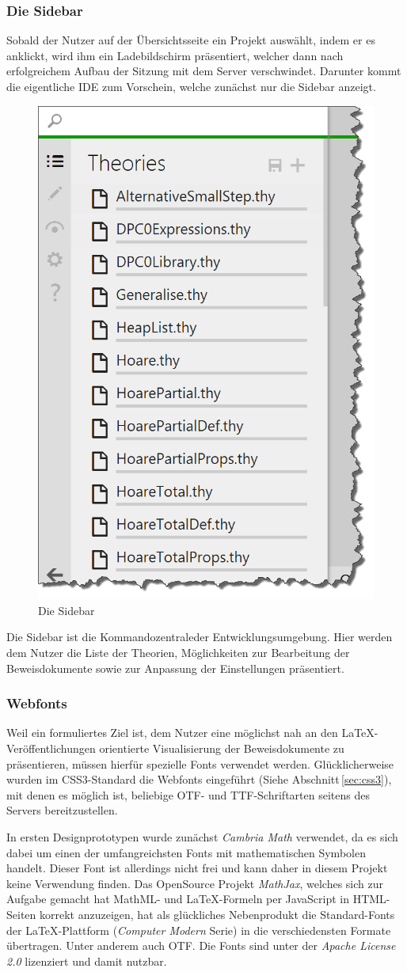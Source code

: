 \subsubsection{Die Sidebar}

Sobald der Nutzer auf der Übersichtsseite ein Projekt auswählt, indem er es anklickt, wird ihm ein
Ladebildschirm präsentiert, welcher dann nach erfolgreichem Aufbau der Sitzung mit dem Server
verschwindet. Darunter kommt die eigentliche IDE zum Vorschein, welche zunächst nur die Sidebar
anzeigt.

\begin{figure}[!ht]
\centering
\includegraphics[width=0.4\linewidth]{images/screen-sidebar}
  \caption{Die Sidebar}
  \label{fig:screen-sidebar}
\end{figure}

Die Sidebar ist die \glqq Kommandozentrale\grqq der Entwicklungsumgebung. Hier werden dem Nutzer die
Liste der Theorien, Möglichkeiten zur Bearbeitung der Beweisdokumente sowie zur Anpassung der
Einstellungen präsentiert.

\subsubsection{Webfonts}

Weil ein formuliertes Ziel ist, dem Nutzer eine möglichst nah an den \LaTeX-Veröffentlichungen
orientierte Visualisierung der Beweisdokumente zu präsentieren, müssen hierfür spezielle Fonts
verwendet werden. Glücklicherweise wurden im CSS3-Standard die Webfonts eingeführt (Siehe
Abschnitt\,\ref{sec:css3}), mit denen es möglich ist, beliebige OTF- und TTF-Schriftarten seitens
des Servers bereitzustellen.

In ersten Designprototypen wurde zunächst \textit{Cambria Math} verwendet, da es sich dabei um einen
der umfangreichsten Fonts mit mathematischen Symbolen handelt. Dieser Font ist allerdings nicht frei
und kann daher in diesem Projekt keine Verwendung finden. Das OpenSource Projekt \textit{MathJax},
welches sich zur Aufgabe gemacht hat MathML- und \LaTeX-Formeln per JavaScript in HTML-Seiten korrekt
anzuzeigen, hat als glückliches Nebenprodukt die Standard-Fonts der \LaTeX-Plattform
(\textit{Computer Modern} Serie) in die verschiedensten Formate übertragen. Unter anderem auch OTF.
Die Fonts sind unter der \textit{Apache License 2.0} lizenziert und damit nutzbar.

